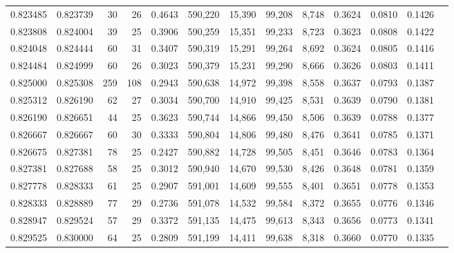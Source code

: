 \begin{tabular}{rrrrrrrrrrrrr}
0.823485 & 0.823739 &     30 &    26 &                                     0.4643 & 590,220 &  15,390 &  99,208 &   8,748 & 0.3624 & 0.0810 & 0.1426 \\
0.823808 & 0.824004 &     39 &    25 &                                     0.3906 & 590,259 &  15,351 &  99,233 &   8,723 & 0.3623 & 0.0808 & 0.1422 \\
0.824048 & 0.824444 &     60 &    31 &                                     0.3407 & 590,319 &  15,291 &  99,264 &   8,692 & 0.3624 & 0.0805 & 0.1416 \\
0.824484 & 0.824999 &     60 &    26 &                                     0.3023 & 590,379 &  15,231 &  99,290 &   8,666 & 0.3626 & 0.0803 & 0.1411 \\
0.825000 & 0.825308 &    259 &   108 &                                     0.2943 & 590,638 &  14,972 &  99,398 &   8,558 & 0.3637 & 0.0793 & 0.1387 \\
0.825312 & 0.826190 &     62 &    27 &                                     0.3034 & 590,700 &  14,910 &  99,425 &   8,531 & 0.3639 & 0.0790 & 0.1381 \\
0.826190 & 0.826651 &     44 &    25 &                                     0.3623 & 590,744 &  14,866 &  99,450 &   8,506 & 0.3639 & 0.0788 & 0.1377 \\
0.826667 & 0.826667 &     60 &    30 &                                     0.3333 & 590,804 &  14,806 &  99,480 &   8,476 & 0.3641 & 0.0785 & 0.1371 \\
0.826675 & 0.827381 &     78 &    25 &                                     0.2427 & 590,882 &  14,728 &  99,505 &   8,451 & 0.3646 & 0.0783 & 0.1364 \\
0.827381 & 0.827688 &     58 &    25 &                                     0.3012 & 590,940 &  14,670 &  99,530 &   8,426 & 0.3648 & 0.0781 & 0.1359 \\
0.827778 & 0.828333 &     61 &    25 &                                     0.2907 & 591,001 &  14,609 &  99,555 &   8,401 & 0.3651 & 0.0778 & 0.1353 \\
0.828333 & 0.828889 &     77 &    29 &                                     0.2736 & 591,078 &  14,532 &  99,584 &   8,372 & 0.3655 & 0.0776 & 0.1346 \\
0.828947 & 0.829524 &     57 &    29 &                                     0.3372 & 591,135 &  14,475 &  99,613 &   8,343 & 0.3656 & 0.0773 & 0.1341 \\
0.829525 & 0.830000 &     64 &    25 &                                     0.2809 & 591,199 &  14,411 &  99,638 &   8,318 & 0.3660 & 0.0770 & 0.1335 \\

\end{tabular}
